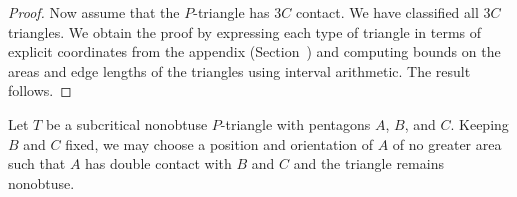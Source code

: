 \begin{proof}

Now assume that the $P$-triangle has $3C$ contact.  We have classified
all $3C$ triangles.  We obtain the proof by expressing each type of
triangle in terms of explicit coordinates from the appendix
(Section~) and computing bounds on the areas and
edge lengths of the triangles using interval arithmetic.  The result
follows.
\end{proof}

\begin{lemma} 
  Let $T$ be a subcritical nonobtuse $P$-triangle with pentagons $A$,
  $B$, and $C$. Keeping $B$ and $C$ fixed, we may choose a position
  and orientation of $A$ of no greater area such that $A$ has double
  contact with $B$ and $C$ and the triangle remains nonobtuse.
\end{lemma}

